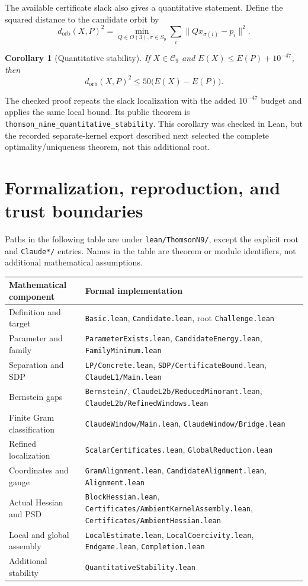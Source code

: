 \documentclass[11pt]{article}
\newtheorem{corollary}[theorem]{Corollary}
\theoremstyle{remark}
\newcommand{\norm}[1]{\lVert #1\rVert}
\newcommand{\code}[1]{{\small\nolinkurl{#1}}}
\newcommand{\pathcode}[1]{\nolinkurl{#1}}
\begin{document}
The available certificate slack also gives a quantitative statement. Define
the squared distance to the candidate orbit by
\[
 d_{\mathrm{orb}}(X,P)^2=
 \min_{Q\in O(3),\sigma\in S_9}\sum_i\norm{Qx_{\sigma(i)}-p_i}^2.
\]
\begin{corollary}[Quantitative stability]\label{cor:stability}
If $X\in\mathcal C_9$ and $E(X)\le E(P)+10^{-47}$, then
\[
 d_{\mathrm{orb}}(X,P)^2\le50\bigl(E(X)-E(P)\bigr).
\]
\end{corollary}
The checked proof repeats the slack localization with the added $10^{-47}$
budget and applies the same local bound. Its public theorem is
\code{thomson_nine_quantitative_stability}. This corollary was checked in
Lean, but the recorded separate-kernel export described next selected the
complete optimality/uniqueness theorem, not this additional root.

\section{Formalization, reproduction, and trust boundaries}\label{sec:verification}
Paths in the following table are under \pathcode{lean/ThomsonN9/}, except the
explicit root and \pathcode{Claude*/} entries. Names in the table are theorem
or module identifiers, not additional mathematical assumptions.
\begin{center}\small
\begin{tabular}{p{.29\linewidth}p{.64\linewidth}}
\toprule
Mathematical component & Formal implementation\\
\midrule
Definition and target & \pathcode{Basic.lean}, \pathcode{Candidate.lean}, root \pathcode{Challenge.lean}\\
Parameter and family & \pathcode{ParameterExists.lean}, \pathcode{CandidateEnergy.lean}, \pathcode{FamilyMinimum.lean}\\
Separation and SDP & \pathcode{LP/Concrete.lean}, \pathcode{SDP/CertificateBound.lean}, \pathcode{ClaudeL1/Main.lean}\\
Bernstein gaps & \pathcode{Bernstein/}, \pathcode{ClaudeL2b/ReducedMinorant.lean}, \pathcode{ClaudeL2b/RefinedWindows.lean}\\
Finite Gram classification & \pathcode{ClaudeWindow/Main.lean}, \pathcode{ClaudeWindow/Bridge.lean}\\
Refined localization & \pathcode{ScalarCertificates.lean}, \pathcode{GlobalReduction.lean}\\
Coordinates and gauge & \pathcode{GramAlignment.lean}, \pathcode{CandidateAlignment.lean}, \pathcode{Alignment.lean}\\
Actual Hessian and PSD & \pathcode{BlockHessian.lean}, \pathcode{Certificates/AmbientKernelAssembly.lean}, \pathcode{Certificates/AmbientHessian.lean}\\
Local and global assembly & \pathcode{LocalEstimate.lean}, \pathcode{LocalCoercivity.lean}, \pathcode{Endgame.lean}, \pathcode{Completion.lean}\\
Additional stability & \pathcode{QuantitativeStability.lean}\\
\bottomrule
\end{tabular}
\end{center}
\end{document}

